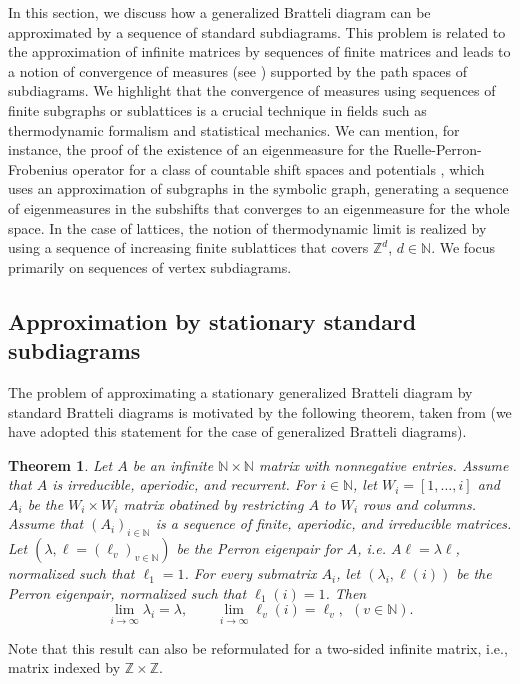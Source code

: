 \documentclass[11pt,reqno]{amsart}
\theoremstyle{definition}
\theoremstyle{remark}
\theoremstyle{plain}
\newtheorem{thm}[definition]{Theorem}
\newcommand{\N}{\mathbb N}
\newcommand{\Z}{\mathbb Z}
\numberwithin{equation}{section}
\begin{document}
In this section, we discuss how a generalized Bratteli diagram can be approximated by a sequence of standard subdiagrams. This problem is related to the approximation of infinite matrices by sequences of finite matrices and leads to a notion of convergence of measures (see ) supported by the path spaces of subdiagrams. We highlight that the convergence of measures using sequences of finite subgraphs or sublattices is a crucial technique in fields such as thermodynamic formalism and statistical mechanics. We can mention, for instance, the proof of the existence of an eigenmeasure for the Ruelle-Perron-Frobenius operator for a class of countable shift spaces and potentials \cite{MauUr2001}, which uses an approximation of subgraphs in the symbolic graph, generating a sequence of eigenmeasures in the subshifts that converges to an eigenmeasure for the whole space. In the case of lattices, the notion of thermodynamic limit is realized by using a sequence of increasing finite sublattices that covers $\mathbb{Z}^d$, $d \in \mathbb{N}$. We focus primarily on sequences of vertex subdiagrams.

\subsection{Approximation by stationary standard subdiagrams} 

The problem of approximating a stationary generalized Bratteli diagram by standard Bratteli diagrams is motivated by the following theorem, taken from \cite{Kitchens1998} (we have adopted this statement for the case of generalized Bratteli diagrams). 

\begin{thm}\cite[Theorem 7.1.4]{Kitchens1998}\label{Thm_approximation_Kitchens} 
Let $A$ be an infinite $\N \times \N$ matrix with nonnegative entries. Assume that $A$
is irreducible, aperiodic, and recurrent. For $i\in \N$, let $W_i = [1, \ldots, i]$ and $A_i$ be the $W_i \times W_i$ matrix obatined by restricting $A$ to $W_i$ rows and columns. Assume that $(A_i)_{i \in \N}$ is a sequence of finite, aperiodic, and irreducible matrices. Let $(\lambda, \ell = (\ell_v)_{v \in \N})$ be the Perron eigenpair for $A$, i.e. $A\ell = \lambda\ell$, normalized such that $\ell_1 =1$. 
For every submatrix $A_i$, let $(\lambda_i, \ell(i))$ be the Perron eigenpair, normalized such that $\ell_1(i) =1$. Then 
$$
\lim_{i \to\infty} \lambda_i = \lambda, \qquad \lim_{i\to\infty} 
\ell_v(i) = \ell_v, \ \ (v\in \N).
$$
\end{thm} Note that this result can also be reformulated for a two-sided infinite matrix, i.e., matrix indexed by $\Z \times \Z$.
\end{document}
